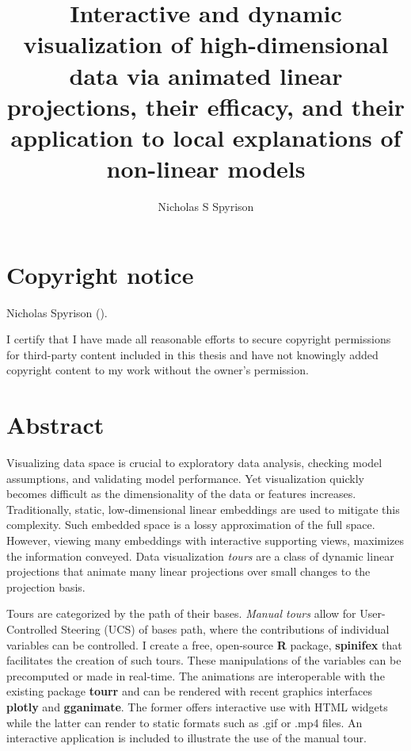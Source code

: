 \documentclass{template/monashthesis}
\author{Nicholas S Spyrison}
\title{Interactive and dynamic visualization of high-dimensional data via animated linear projections, their efficacy, and their application to local explanations of non-linear models}
\begin{document}

\titlepage

{\sf\tighttoc\doublespacing}

\hypertarget{ch-copyright}{%
\chapter*{Copyright notice}\label{ch-copyright}}

\textcopyright { }Nicholas Spyrison (\number\the\year).

I certify that I have made all reasonable efforts to secure copyright permissions for third-party content included in this thesis and have not knowingly added copyright content to my work without the owner's permission.

\newpage

\hypertarget{abstract}{%
\chapter*{Abstract}\label{abstract}}

Visualizing data space is crucial to exploratory data analysis, checking model assumptions, and validating model performance. Yet visualization quickly becomes difficult as the dimensionality of the data or features increases. Traditionally, static, low-dimensional linear embeddings are used to mitigate this complexity. Such embedded space is a lossy approximation of the full space. However, viewing many embeddings with interactive supporting views, maximizes the information conveyed. Data visualization \emph{tours} are a class of dynamic linear projections that animate many linear projections over small changes to the projection basis.

Tours are categorized by the path of their bases. \emph{Manual tours} allow for User-Controlled Steering (UCS) of bases path, where the contributions of individual variables can be controlled. I create a free, open-source \textbf{R} package, \textbf{spinifex} that facilitates the creation of such tours. These manipulations of the variables can be precomputed or made in real-time. The animations are interoperable with the existing package \textbf{tourr} and can be rendered with recent graphics interfaces \textbf{plotly} and \textbf{gganimate}. The former offers interactive use with HTML widgets while the latter can render to static formats such as .gif or .mp4 files. An interactive application is included to illustrate the use of the manual tour.
\end{document}
